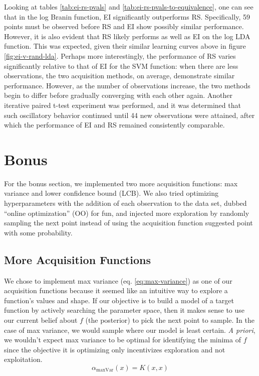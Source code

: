 \documentclass[11pt]{article}
\numberwithin{equation}{section}
\begin{document}
Looking at tables \ref{tab:ei-rs-pvals} and \ref{tab:ei-rs-pvals-to-equivalence}, one can see that in the log Branin function, EI significantly outperforms RS. Specifically, 59 points must be observed before RS and EI show possibly similar performance.
However, it is also evident that RS likely performs as well as EI on the log LDA function. This was expected, given their similar learning curves above in figure \ref{fig:ei-v-rand-lda}.
Perhaps more interestingly, the performance of RS varies significantly relative to that of EI for the SVM function: when there are less observations, the two acquisition methods, on average, demonstrate similar performance. However, as the number of observations increase, the two methods begin to differ before gradually converging with each other again. Another iterative paired t-test experiment was performed, and it was determined that such oscillatory behavior continued until 44 new observations were attained, after which the performance of EI and RS remained consistently comparable.

\section{Bonus}
For the bonus section, we implemented two more acquisition functions: max
variance and lower confidence bound (LCB). We also tried optimizing hyperparameters with the addition of each observation to the data set, dubbed ``online optimization'' (OO) for fun, and injected more exploration by randomly sampling the next point instead of using the acquisition function suggested point with some probability.

\subsection*{More Acquisition Functions}
We chose to implement max variance (eq. \ref{eq:max-variance}) as one of our
acquisition functions because it seemed like an intuitive way to explore a
function's values and shape. If our objective is to build a model of a target
function by actively searching the parameter space, then it makes sense to
use our current belief about $f$ (the posterior) to pick the next point to
sample. In the case of max variance, we would sample where our model is least
certain. \emph{A priori}, we wouldn't expect max variance to be optimal for
identifying the minima of $f$ since the objective it is optimizing only
incentivizes exploration and not exploitation.
\begin{equation}
  \alpha_{\max \text{Var}}(x) = K(x, x)
  \label{eq:max-variance}
\end{equation}
\end{document}

